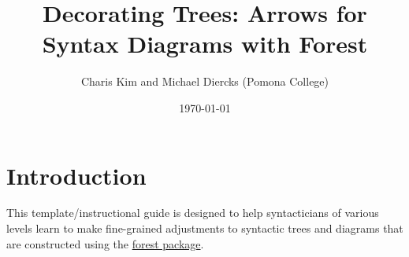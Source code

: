 \documentclass{article}
\title{Decorating Trees: Arrows for Syntax Diagrams with Forest}
\author{Charis Kim and Michael Diercks (Pomona College)}
\date{\today}
\begin{document}
\maketitle




\tableofcontents

\section{Introduction}

This template/instructional guide is designed to help syntacticians of various levels learn to make fine-grained adjustments to syntactic trees and diagrams that are constructed using the \href{https://ctan.org/pkg/forest?lang=en}{forest package}. 
\end{document}
